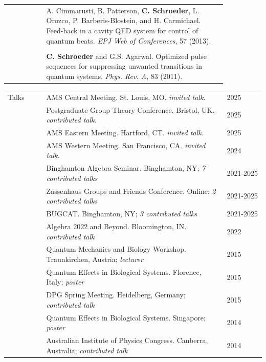 \documentclass[letterpaper,12pt,oneside]{article}
\begin{document}
\begin{longtable}[l]{p{0.15\linewidth}p{0.7\linewidth}}
& A. Cimmarusti, B. Patterson, \textbf{C. Schroeder}, L. Orozco, P. Barberis-Blostein, and H. Carmichael. Feed-back in a cavity QED system for control of quantum beats. \emph{EPJ Web of Conferences}, 57 (2013). \\
& \\

& \textbf{C. Schroeder} and  G.S. Agarwal. Optimized pulse sequences for suppressing unwanted transitions in quantum systems. \emph{Phys. Rev. A}, 83 (2011). 
\end{longtable}


\noindent \begin{longtable}{p{0.15\linewidth}p{0.7\linewidth}p{0.15\linewidth}}

\large{Talks} 
& AMS Central Meeting. St. Louis, MO. \emph{invited talk.} & 2025 \\
& Postgraduate Group Theory Conference. Bristol, UK. \emph{contributed talk.} & 2025 \\
& AMS Eastern Meeting. Hartford, CT. \emph{invited talk.} & 2025 \\
& AMS Western Meeting. San Francisco, CA. \emph{invited talk.} & 2024\\
& Binghamton Algebra Seminar. Binghamton, NY; \emph{7 contributed talks} & 2021-2025 \\
& Zassenhaus Groups and Friends Conference. Online; \emph{2 contributed talks} & 2021-2025 \\
 & BUGCAT. Binghamton, NY; \emph{3 contributed talks} & 2021-2025\\
 & Algebra 2022 and Beyond. Bloomington, IN. \emph{contributed talk} & 2022 \\ 
 & Quantum Mechanics and Biology Workshop. Traunkirchen, Austria; \emph{lecturer} & 2015\\
     & Quantum Effects in Biological Systems. Florence, Italy; \emph{poster} & 2015 \\
     
     & DPG Spring Meeting. Heidelberg, Germany; \emph{contributed talk} & 2015\\
     
     & Quantum Effects in Biological Systems. Singapore; \emph{poster} & 2014 \\
     
     & Australian Institute of Physics Congress. Canberra, Australia; \emph{contributed talk} & 2014 \\
     

\end{longtable}
\end{document}
